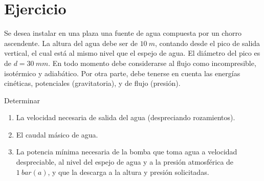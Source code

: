 \section{Ejercicio}\label{ej:Chap04Ejercicio11}

Se desea instalar en una plaza una fuente de agua compuesta por un chorro ascendente. La altura del agua debe ser de $\SI{10}{m}$, contando desde el pico de salida vertical, el cual está al mismo nivel que el espejo de agua. El diámetro del pico es de $d=\SI{30}{mm}$. En todo momento debe considerarse al flujo como incompresible, isotérmico y adiabático. Por otra parte, debe tenerse en cuenta las energías cinéticas, potenciales (gravitatoria), y de flujo (presión).

Determinar
\begin{enumerate}
    \item La velocidad necesaria de salida del agua (despreciando rozamientos).
    \item El caudal másico de agua.
    \item La potencia mínima necesaria de la bomba que toma agua a velocidad despreciable, al nivel del espejo de agua y a la presión atmosférica de $\SI{1}{bar(a)}$, y que la descarga a la altura y presión solicitadas.
\end{enumerate}